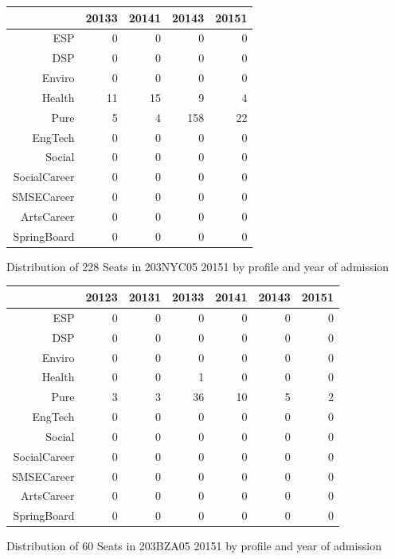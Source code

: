 \documentclass{article}\usepackage[]{graphicx}\usepackage[]{color}
\begin{document}
\begin{figure}[H]
\centering
\begin{tabular}{rrrrr}
  \hline
 & 20133 & 20141 & 20143 & 20151 \\ 
  \hline
ESP &   0 &   0 &   0 &   0 \\ 
  DSP &   0 &   0 &   0 &   0 \\ 
  Enviro &   0 &   0 &   0 &   0 \\ 
  Health &  11 &  15 &   9 &   4 \\ 
  Pure &   5 &   4 & 158 &  22 \\ 
  EngTech &   0 &   0 &   0 &   0 \\ 
  Social &   0 &   0 &   0 &   0 \\ 
  SocialCareer &   0 &   0 &   0 &   0 \\ 
  SMSECareer &   0 &   0 &   0 &   0 \\ 
  ArtsCareer &   0 &   0 &   0 &   0 \\ 
  SpringBoard &   0 &   0 &   0 &   0 \\ 
   \hline
\end{tabular}
\caption{Distribution of 228 Seats in 203NYC05 20151 by profile and year of admission} 
\end{figure}
\begin{figure}[H]
\centering
\begin{tabular}{rrrrrrr}
  \hline
 & 20123 & 20131 & 20133 & 20141 & 20143 & 20151 \\ 
  \hline
ESP &   0 &   0 &   0 &   0 &   0 &   0 \\ 
  DSP &   0 &   0 &   0 &   0 &   0 &   0 \\ 
  Enviro &   0 &   0 &   0 &   0 &   0 &   0 \\ 
  Health &   0 &   0 &   1 &   0 &   0 &   0 \\ 
  Pure &   3 &   3 &  36 &  10 &   5 &   2 \\ 
  EngTech &   0 &   0 &   0 &   0 &   0 &   0 \\ 
  Social &   0 &   0 &   0 &   0 &   0 &   0 \\ 
  SocialCareer &   0 &   0 &   0 &   0 &   0 &   0 \\ 
  SMSECareer &   0 &   0 &   0 &   0 &   0 &   0 \\ 
  ArtsCareer &   0 &   0 &   0 &   0 &   0 &   0 \\ 
  SpringBoard &   0 &   0 &   0 &   0 &   0 &   0 \\ 
   \hline
\end{tabular}
\caption{Distribution of 60 Seats in 203BZA05 20151 by profile and year of admission} 
\end{figure}
\end{document}

